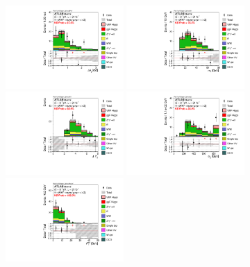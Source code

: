 \begin{figure}[p!]
  \centering
   \includegraphics[width=0.4\textwidth]{fig/analysis/BDTinputVarsInSR/SF_SR_FitRegion_DPhill_mh125_lin.pdf}
   \includegraphics[width=0.4\textwidth]{fig/analysis/BDTinputVarsInSR/SF_SR_FitRegion_Mll_mh125_lin.pdf}
   \includegraphics[width=0.4\textwidth]{fig/analysis/BDTinputVarsInSR/SF_SR_FitRegion_DYjj_mh125_lin.pdf}
   \includegraphics[width=0.4\textwidth]{fig/analysis/BDTinputVarsInSR/SF_SR_FitRegion_Mjj_mh125_lin.pdf}
   \includegraphics[width=0.4\textwidth]{fig/analysis/BDTinputVarsInSR/SF_SR_FitRegion_Pttot_tr_mh125_lin.pdf}

\end{figure}
